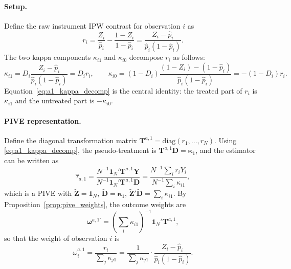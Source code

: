 \documentclass[12pt, a4paper, oneside]{article}
\theoremstyle{plain}
\theoremstyle{definition}
\begin{document}
\paragraph{Setup.}
Define the raw instrument IPW contrast for observation $i$ as
\begin{equation}
  r_i = \frac{Z_i}{\hat{p}_i} - \frac{1-Z_i}{1-\hat{p}_i}
      = \frac{Z_i - \hat{p}_i}{\hat{p}_i(1-\hat{p}_i)}.
  \label{eq:a1_ri}
\end{equation}
The two kappa components $\kappa_{i1}$ and $\kappa_{i0}$ decompose $r_i$ as follows:
\begin{equation}
  \kappa_{i1} = D_i \frac{Z_i - \hat{p}_i}{\hat{p}_i(1-\hat{p}_i)} = D_i r_i,
  \qquad
  \kappa_{i0} = (1-D_i)\frac{(1-Z_i)-(1-\hat{p}_i)}{\hat{p}_i(1-\hat{p}_i)}
              = -(1-D_i)r_i.
  \label{eq:a1_kappa_decomp}
\end{equation}
Equation~\eqref{eq:a1_kappa_decomp} is the central identity: the treated part of $r_i$
is $\kappa_{i1}$ and the untreated part is $-\kappa_{i0}$.

\paragraph{PIVE representation.}
Define the diagonal transformation matrix
$\mathbf{T}^{a,1} = \mathrm{diag}(r_1, \ldots, r_N)$.
Using \eqref{eq:a1_kappa_decomp}, the pseudo-treatment is
$\mathbf{T}^{a,1}\mathbf{D} = \boldsymbol{\kappa}_1$,
and the estimator can be written as
\begin{equation}
  \hat\tau_{a,1}
  = \frac{N^{-1}\mathbf{1}_N'\mathbf{T}^{a,1}\mathbf{Y}}
         {N^{-1}\mathbf{1}_N'\mathbf{T}^{a,1}\mathbf{D}}
  = \frac{N^{-1}\sum_i r_i Y_i}{N^{-1}\sum_i \kappa_{i1}},
  \label{eq:a1_wald}
\end{equation}
which is a PIVE with $\widetilde{\mathbf{Z}} = \mathbf{1}_N$,
$\widetilde{\mathbf{D}} = \boldsymbol{\kappa}_1$,
$\widetilde{\mathbf{Z}}'\widetilde{\mathbf{D}} = \sum_i\kappa_{i1}$.
By Proposition~\ref{prop:pive_weights}, the outcome weights are
\begin{equation}
  \boldsymbol{\omega}^{a,1\prime}
  = \left(\sum_i\kappa_{i1}\right)^{-1} \mathbf{1}_N' \mathbf{T}^{a,1},
  \label{eq:a1_omega_vec}
\end{equation}
so that the weight of observation $i$ is
\begin{equation}
  \boxed{
    \omega_i^{a,1} = \frac{r_i}{\sum_j \kappa_{j1}}
    = \frac{1}{\sum_j \kappa_{j1}}
      \cdot\frac{Z_i - \hat{p}_i}{\hat{p}_i(1-\hat{p}_i)}.
  }
  \label{eq:a1_omega_scalar}
\end{equation}
\end{document}
